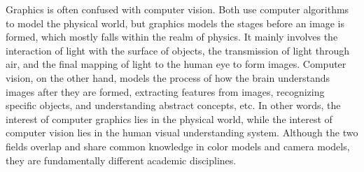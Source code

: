 Graphics is often confused with computer vision. Both use computer algorithms to model the physical world, but graphics models the stages before an image is formed, which mostly falls within the realm of physics. It mainly involves the interaction of light with the surface of objects, the transmission of light through air, and the final mapping of light to the human eye to form images. Computer vision, on the other hand, models the process of how the brain understands images after they are formed, extracting features from images, recognizing specific objects, and understanding abstract concepts, etc. In other words, the interest of computer graphics lies in the physical world, while the interest of computer vision lies in the human visual understanding system. Although the two fields overlap and share common knowledge in color models and camera models, they are fundamentally different academic disciplines.